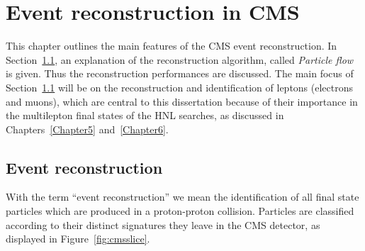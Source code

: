 \chapter{Event reconstruction in CMS} \label{Chapter2_5} 



This chapter outlines the main features of the CMS event
reconstruction. In Section~\ref{sec:reconstruction}, an explanation of
the reconstruction algorithm, called \emph{Particle flow} is
given. Thus the reconstruction performances are discussed. 
The main focus of Section~\ref{sec:reconstruction} will be on the reconstruction and identification of leptons (\ie electrons and muons), which are central to this dissertation because of their importance in the multilepton final states of the HNL searches, as discussed in Chapters~\ref{Chapter5} and~\ref{Chapter6}.



\section{Event reconstruction}\label{sec:reconstruction}
With the term ``event reconstruction'' we mean the identification of
all final state particles which are produced in a proton-proton
collision. Particles are classified according to their distinct
signatures they leave in 
the CMS detector, as displayed in Figure~\ref{fig:cmsslice}.

